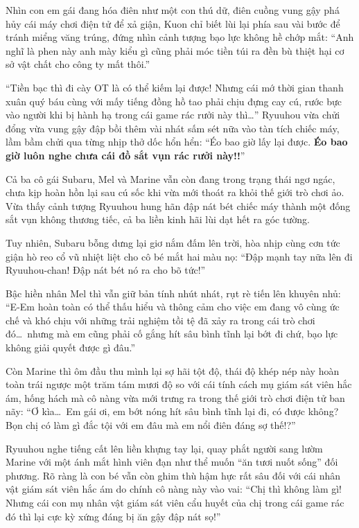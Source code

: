 \documentclass[../main.tex]{subfiles}
\begin{document}
Nhìn con em gái đang hóa điên như một con thú dữ, điên cuồng vung gậy phá hủy cái máy chơi điện tử để xả giận, Kuon chỉ biết lùi lại phía sau vài bước để tránh miểng văng trúng, đứng nhìn cảnh tượng bạo lực không hề chớp mắt: ``Anh nghĩ là phen này anh mày kiểu gì cũng phải móc tiền túi ra đền bù thiệt hại cơ sở vật chất cho công ty mất thôi.''

``Tiền bạc thì đi cày OT là có thể kiếm lại được! Nhưng cái mớ thời gian thanh xuân quý báu cùng với mấy tiếng đồng hồ tao phải chịu đựng cay cú, rước bực vào người khi bị hành hạ trong cái game rác rưởi này thì\dots'' Ryuuhou vừa chửi đổng vừa vung gậy đập bồi thêm vài nhát sấm sét nữa vào tàn tích chiếc máy, lầm bầm chửi qua từng nhịp thở dốc hổn hển: ``Éo bao giờ lấy lại được. \textbf{Éo bao giờ luôn nghe chưa cái đồ sắt vụn rác rưởi này!!}''

Cả ba cô gái Subaru, Mel và Marine vẫn còn đang trong trạng thái ngơ ngác, chưa kịp hoàn hồn lại sau cú sốc khi vừa mới thoát ra khỏi thế giới trò chơi ảo. Vừa thấy cảnh tượng Ryuuhou hung hãn đập nát bét chiếc máy thành một đống sắt vụn không thương tiếc, cả ba liền kinh hãi lùi dạt hết ra góc tường.

Tuy nhiên, Subaru bỗng dưng lại giơ nắm đấm lên trời, hòa nhịp cùng cơn tức giận hò reo cổ vũ nhiệt liệt cho cô bé mắt hai màu nọ: ``Đập mạnh tay nữa lên đi Ryuuhou-chan! Đập nát bét nó ra cho bõ tức!''

Bậc hiền nhân Mel thì vẫn giữ bản tính nhút nhát, rụt rè tiến lên khuyên nhủ: ``E-Em hoàn toàn có thể thấu hiểu và thông cảm cho việc em đang vô cùng ức chế và khó chịu với những trải nghiệm tồi tệ đã xảy ra trong cái trò chơi đó\dots\ nhưng mà em cũng phải cố gắng hít sâu bình tĩnh lại bớt đi chứ, bạo lực không giải quyết được gì đâu.''

Còn Marine thì ôm đầu thu mình lại sợ hãi tột độ, thái độ khép nép này hoàn toàn trái ngược một trăm tám mươi độ so với cái tính cách mụ giám sát viên hắc ám, hống hách mà cô nàng vừa mới trưng ra trong thế giới trò chơi điện tử ban nãy: ``Ơ kìa\dots\ Em gái ơi, em bớt nóng hít sâu bình tĩnh lại đi, có được không? Bọn chị có làm gì đắc tội với em đâu mà em nổi điên đáng sợ thế!?''

Ryuuhou nghe tiếng cất lên liền khựng tay lại, quay phắt người sang lườm Marine với một ánh mắt hình viên đạn như thể muốn ``ăn tươi nuốt sống'' đối phương. Rõ ràng là con bé vẫn còn ghim thù hậm hực rất sâu đối với cái nhân vật giám sát viên hắc ám do chính cô nàng này vào vai: ``Chị thì không làm gì! Nhưng cái con mụ nhân vật giám sát viên cẩu huyết của chị trong cái game rác đó thì lại cực kỳ xứng đáng bị ăn gậy đập nát sọ!''
\end{document}
